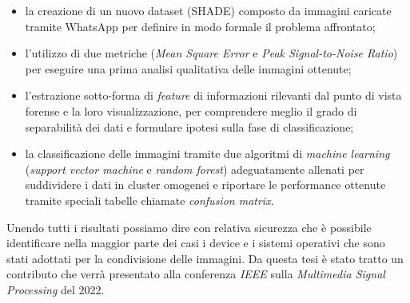 \begin{itemize}
    \item la creazione di un nuovo dataset (SHADE) composto da immagini caricate tramite WhatsApp per definire in modo formale il problema affrontato;
    
    \item l'utilizzo di due metriche (\textit{Mean Square Error} e \textit{Peak Signal-to-Noise Ratio}) per eseguire una prima analisi qualitativa delle immagini ottenute;
    
    \item l'estrazione sotto-forma di \textit{feature} di informazioni rilevanti dal punto di vista forense e la loro visualizzazione, per comprendere meglio il grado di separabilità dei dati e formulare ipotesi sulla fase di classificazione;
    
    \item la classificazione delle immagini tramite due algoritmi di \textit{machine learning} (\textit{support vector machine} e \textit{random forest}) adeguatamente allenati per suddividere i dati in cluster omogenei e riportare le performance ottenute tramite speciali tabelle chiamate \textit{confusion matrix}.
\end{itemize}
Unendo tutti i risultati possiamo dire con relativa sicurezza che è possibile identificare nella maggior parte dei casi i device e i sistemi operativi che sono stati adottati per la condivisione delle immagini. Da questa tesi è stato tratto un contributo \cite{tomasoni2022device} che verrà presentato alla conferenza \textit{IEEE} sulla \textit{Multimedia Signal Processing} del 2022.\newpage



